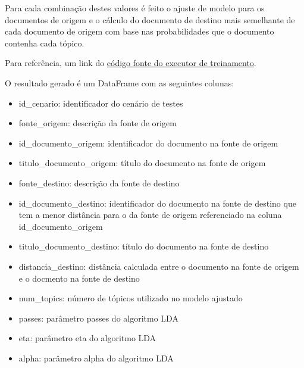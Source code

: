 Para cada combinação destes valores é feito o ajuste de modelo para os documentos de origem e o cálculo do documento de destino mais semelhante de 
cada documento de origem com base nas probabilidades que o documento contenha cada tópico.

Para referência, um link do \href{https://github.com/heldergr/tcc-pucmg-2/blob/main/src/python/notebooks/main/executor.py}{código fonte do executor de treinamento}.

O resultado gerado é um DataFrame com as seguintes colunas:

\begin{itemize}
    \item id\_cenario: identificador do cenário de testes
    \item fonte\_origem: descrição da fonte de origem
    \item id\_documento\_origem: identificador do documento na fonte de origem
    \item titulo\_documento\_origem: título do documento na fonte de origem
    \item fonte\_destino: descrição da fonte de destino
    \item id\_documento\_destino: identificador do documento na fonte de destino que tem a menor distância para o da fonte de origem referenciado na coluna id\_documento\_origem
    \item titulo\_documento\_destino: título do documento na fonte de destino
    \item distancia\_destino: distância calculada entre o documento na fonte de origem e o docmento na fonte de destino
    \item num\_topics: número de tópicos utilizado no modelo ajustado
    \item passes: parâmetro passes do algoritmo LDA
    \item eta: parâmetro eta do algoritmo LDA
    \item alpha: parâmetro alpha do algoritmo LDA
\end{itemize}
